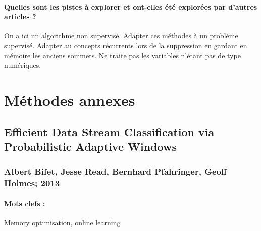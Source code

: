 \documentclass[11pt,a4paper]{report}
\begin{document}
\paragraph{Quelles sont les pistes à explorer et ont-elles  été explorées par d'autres articles ? } On a ici un algorithme non supervisé. Adapter ces méthodes à un problème supervisé. Adapter au concepts récurrents lors de la suppression en gardant en mémoire les anciens sommets. Ne traite pas les variables n'étant pas de type numériques.


















\newpage


















\section{Méthodes annexes}

\subsection{Efficient Data Stream Classification via Probabilistic Adaptive Windows}
\subsubsection{Albert Bifet, Jesse Read, Bernhard Pfahringer, Geoff Holmes; 2013}

\paragraph{Mots clefs :}Memory optimisation, online learning 
\end{document}

